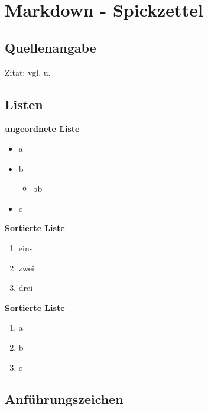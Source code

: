 \section{Markdown - Spickzettel}\label{markdown---spickzettel}

\subsection{Quellenangabe}\label{quellenangabe}

Zitat: vgl. \cite{monk_action_buch:2016} u. \cite{kofler_linux:2017}

\subsection{Listen}\label{listen}

\textbf{ungeordnete Liste}

\begin{itemize}
\item
  a
\item
  b

  \begin{itemize}
  \item
    bb
  \end{itemize}
\item
  c
\end{itemize}

\textbf{Sortierte Liste}

\begin{enumerate}
\item
  eins
\item
  zwei
\item
  drei
\end{enumerate}

\textbf{Sortierte Liste}

\begin{enumerate}
\item
  a
\item
  b
\item
  c
\end{enumerate}

\subsection{Anführungszeichen}\label{anfuehrungszeichen}

